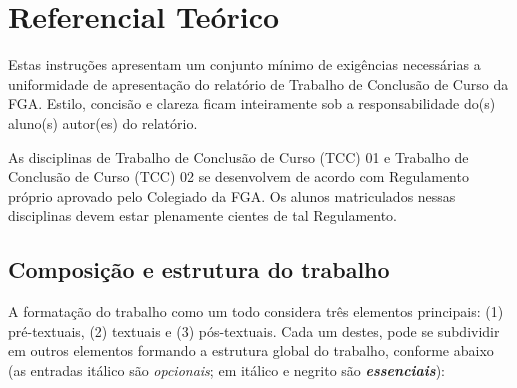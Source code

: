 \chapter[Referencial Teórico]{Referencial Teórico}
\label{sec:referencial}
Estas instruções apresentam um conjunto mínimo de exigências necessárias a
uniformidade de apresentação do relatório de Trabalho de Conclusão de Curso
da FGA. Estilo, concisão e clareza ficam inteiramente sob a
responsabilidade do(s) aluno(s) autor(es) do relatório.

As disciplinas de Trabalho de Conclusão de Curso (TCC) 01 e Trabalho de
Conclusão de Curso (TCC) 02 se desenvolvem de acordo com Regulamento próprio
aprovado pelo Colegiado da FGA. Os alunos matriculados nessas disciplinas devem
estar plenamente cientes de tal Regulamento.

\section{Composição e estrutura do trabalho}

A formatação do trabalho como um todo considera três elementos principais: (1)
pré-textuais, (2) textuais e (3) pós-textuais. Cada um destes, pode se
subdividir em outros elementos formando a estrutura global do trabalho,
conforme abaixo (as entradas itálico são \textit{opcionais}; em itálico e
negrito são \textbf{\textit{essenciais}}):

